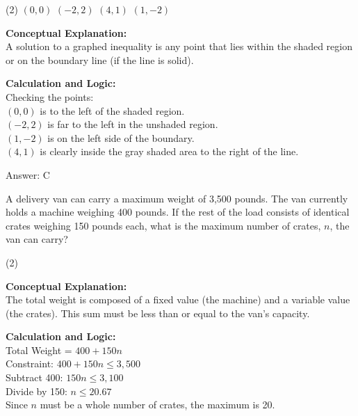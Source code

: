 \documentclass[11pt,paper=a4,answers]{exam}
\begin{document}
\begin{questions}
\begin{center}
\end{center}

\begin{tasks}(2)
    \task $(0, 0)$
    \task $(-2, 2)$
    \task $(4, 1)$
    \task $(1, -2)$
\end{tasks}

\begin{solution}
\textbf{Conceptual Explanation:} \\
A solution to a graphed inequality is any point that lies within the shaded region or on the boundary line (if the line is solid).

\vspace{10pt}
\textbf{Calculation and Logic:} \\
Checking the points: \\
$(0, 0)$ is to the left of the shaded region. \\
$(-2, 2)$ is far to the left in the unshaded region. \\
$(1, -2)$ is on the left side of the boundary. \\
$(4, 1)$ is clearly inside the gray shaded area to the right of the line.

\vspace{15pt}
Answer: \colorbox{yellow!100}{C}
\end{solution}

\question
A delivery van can carry a maximum weight of 3,500 pounds. The van currently holds a machine weighing 400 pounds. If the rest of the load consists of identical crates weighing 150 pounds each, what is the maximum number of crates, $n$, the van can carry?
\begin{tasks}(2)
\end{tasks}

\begin{solution}
\textbf{Conceptual Explanation:} \\
The total weight is composed of a fixed value (the machine) and a variable value (the crates). This sum must be less than or equal to the van's capacity.

\vspace{10pt}
\textbf{Calculation and Logic:} \\
Total Weight = $400 + 150n$ \\
Constraint: $400 + 150n \le 3,500$ \\
Subtract 400: $150n \le 3,100$ \\
Divide by 150: $n \le 20.67$ \\
Since $n$ must be a whole number of crates, the maximum is 20.


\end{solution}
\end{questions}
\end{document}
